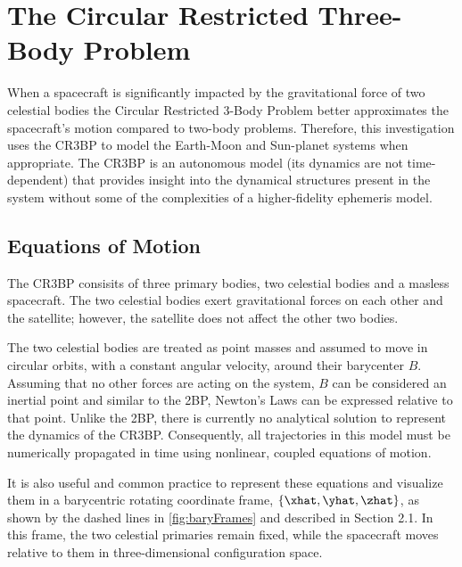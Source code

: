 \section{The Circular Restricted Three-Body Problem}
When a spacecraft is significantly impacted by the gravitational force of
two celestial bodies the Circular Restricted 3-Body Problem better approximates the spacecraft's
motion compared to two-body problems. Therefore, this investigation uses the CR3BP to model the
Earth-Moon and Sun-planet systems when appropriate. The CR3BP is an autonomous model (its dynamics
are not time-dependent) that provides insight into the dynamical structures present in the system
without some of the complexities of a higher-fidelity ephemeris model.

\subsection{Equations of Motion}
The CR3BP consisits of three primary bodies, two celestial bodies and a masless spacecraft. The two
celestial bodies exert gravitational forces on each other and the satellite; however, the satellite
does not affect the other two bodies. 

The two celestial bodies are treated as point masses and assumed to move in circular orbits, with a
constant angular velocity, around their barycenter $B$. Assuming that no other forces are acting on
the system, $B$ can be considered an inertial point and similar to the 2BP, Newton's Laws can be
expressed relative to that point. Unlike the 2BP, there is currently no analytical solution to
represent the dynamics of the CR3BP. Consequently, all trajectories in this model must be
numerically propagated in time using nonlinear, coupled equations of motion.

It is also useful and common practice to represent these equations and visualize them in a
barycentric rotating coordinate frame, $\{\xhat,\yhat,\zhat\}$, as shown by the dashed lines in
\cref{fig:baryFrames} and described in Section 2.1. In this frame, the two celestial primaries
remain fixed, while the spacecraft moves relative to them in three-dimensional configuration space.

